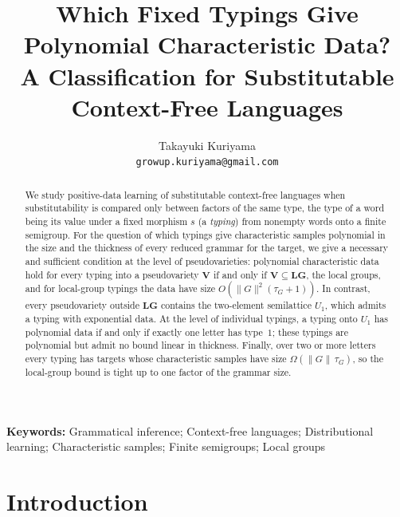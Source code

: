 \documentclass[11pt]{article}
\title{Which Fixed Typings Give Polynomial Characteristic Data?\\
A Classification for Substitutable Context-Free Languages}
\author{Takayuki Kuriyama\\
\texttt{growup.kuriyama@gmail.com}}
\date{}
\numberwithin{equation}{section}
\theoremstyle{plain}
\theoremstyle{definition}
\theoremstyle{remark}
\theoremstyle{plain}
\newcommand{\LG}{\mathbf{LG}}
\begin{document}
\maketitle

\begin{abstract}
We study positive-data learning of substitutable context-free languages
when substitutability is compared only between factors of the same type,
the type of a word being its value under a fixed morphism $s$
(a \emph{typing}) from nonempty words onto a finite semigroup.  For the
question of which typings give characteristic samples polynomial in the
size and the thickness of every reduced grammar for the target, we give a
necessary and sufficient condition at the level of pseudovarieties:
polynomial characteristic data hold for every typing into a pseudovariety
$\mathbf V$ if and only if $\mathbf V\subseteq\LG$, the local groups, and
for local-group typings the data have size $O(\|G\|^2(\tau_G+1))$.  In
contrast, every pseudovariety outside $\LG$ contains the two-element
semilattice $U_1$, which admits a typing with exponential data.  At the
level of individual typings, a typing onto $U_1$ has polynomial data if and
only if exactly one letter has type~$1$; these typings are polynomial but
admit no bound linear in thickness.  Finally, over two or more letters
every typing has targets whose characteristic samples have size
$\Omega(\|G\|\,\tau_G)$, so the local-group bound is tight up to one factor
of the grammar size.
\end{abstract}

\noindent\textbf{Keywords:} Grammatical inference; Context-free languages;
Distributional learning; Characteristic samples; Finite semigroups; Local groups

\section{Introduction}
\label{sec:introduction}
\end{document}
